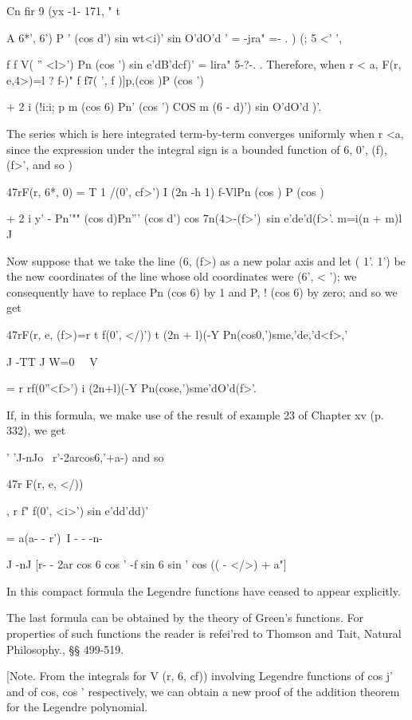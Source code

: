 Cn fir 9 (yx -1- 171, " t

A 6*', 6') P ' (cos d') sin wt<i)' sin O'dO'd ' = -jra" =- . ) (; 5
<' ',

f f V( '' <l>') Pn (cos ') sin e'dB'dcf)' = lira" 5-?-. . Therefore,
when r < a, F(r, e,4>)=l ? f-)" f f7( ', f )]p,(cos )P (cos ')

+ 2 i (!i:i; p m (cos 6) Pn' (cos ') COS m (6 - d)') sin O'dO'd )'.

The series which is here integrated term-by-term converges uniformly
when r <a, since the expression under the integral sign is a bounded
function of 6, 0', (f), (f>', and so  )

47rF(r, 6*, 0) = T 1 /(0', cf>') I (2n -h 1) f-VlPn (cos ) P (cos )

+ 2 i y' - Pn'"" (cos d)Pn''' (cos d') cos 7n(4>-(f>')\ sin
e'de'd(f>'. m=i(n + m)l J

Now suppose that we take the line (6, (f>) as a new polar axis and let
( 1'. 1') be the new coordinates of the line whose old coordinates
were (6', < '); we consequently have to replace Pn (cos 6) by 1 and
P, ! (cos 6) by zero; and so we get

47rF(r, e, (f>)=r t f(0', </)') t (2n + l)(-Y
Pn(cos0,')sme,'de,'d<f>,'

J -TT J W=0 \ \ V

= r rf(0''<f>') i (2n+l)(-Y Pn(cose,')sme'dO'd(f>'.

If, in this formula, we make use of the result of example 23 of
Chapter xv (p. 332), we get

 ' 'J-nJo \ r'-2arcos6,'+a-) and so

47r F(r, e, </))

, r f" f(0', <i>') sin e'dd'dd)'

= a(a- - r')\ I - - -n-

J -nJ [r- - 2ar cos 6 cos ' -f sin 6 sin ' cos (( - </>) + a"]

In this compact formula the Legendre functions have ceased to appear
explicitly.

%
%

The last formula can be obtained by the theory of Green's functions.
For properties of such functions the reader is refei'red to Thomson
and Tait, Natural Philosophy., §§ 499-519.

[Note. From the integrals for V (r, 6, cf)) involving Legendre
functions of cos j' and of cos, cos ' respectively, we can obtain a
new proof of the addition theorem for the Legendre polynomial.

